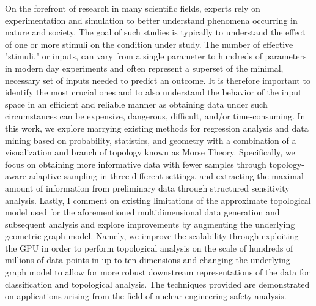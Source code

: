 On the forefront of research in many scientific fields, experts rely on experimentation and simulation to better understand phenomena occurring in nature and society.
%
The goal of such studies is typically to understand the effect of one or more stimuli on the condition under study.
%
The number of effective "stimuli," or inputs, can vary from a single parameter to hundreds of parameters in modern day experiments and often represent a superset of the minimal, necessary set of inputs needed to predict an outcome.
%
It is therefore important to identify the most crucial ones and to also understand the behavior of the input space in an efficient and reliable manner as obtaining data under such circumstances can be expensive, dangerous, difficult, and/or time-consuming.
%
In this work, we explore marrying existing methods for regression analysis and data mining based on probability, statistics, and geometry with a combination of a visualization and branch of topology known as Morse Theory.
%
Specifically, we focus on obtaining more informative data with fewer samples through topology-aware adaptive sampling in three different settings, and extracting the maximal amount of information from preliminary data through structured sensitivity analysis.
%
Lastly, I comment on existing limitations of the approximate topological model used for the aforementioned multidimensional data generation and subsequent analysis and explore improvements by augmenting the underlying geometric graph model.
%
Namely, we improve the scalability through exploiting the GPU in order to perform topological analysis on the scale of hundreds of millions of data points in up to ten dimensions and changing the underlying graph model to allow for more robust downstream representations of the data for classification and topological analysis.
%
The techniques provided are demonstrated on applications arising from the field of nuclear engineering safety analysis.